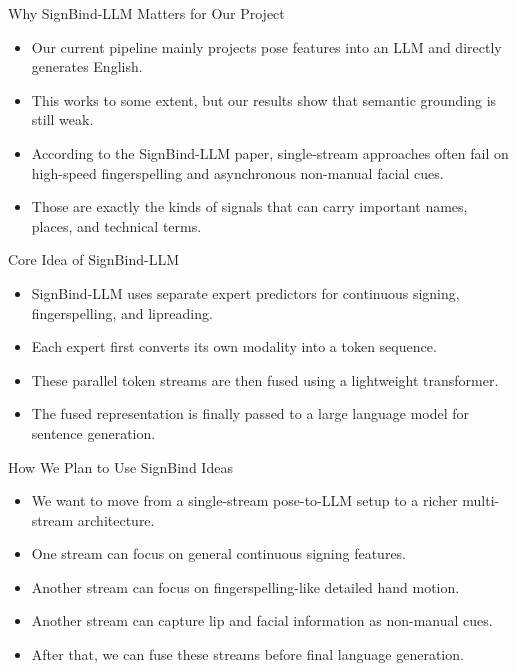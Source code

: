 \documentclass[aspectratio=169]{beamer}
\begin{document}
\begin{frame}{Why SignBind-LLM Matters for Our Project}
\begin{itemize}
  \item Our current pipeline mainly projects pose features into an LLM and directly generates English.
  \item This works to some extent, but our results show that semantic grounding is still weak.
  \item According to the SignBind-LLM paper, single-stream approaches often fail on high-speed fingerspelling and asynchronous non-manual facial cues.
  \item Those are exactly the kinds of signals that can carry important names, places, and technical terms.
\end{itemize}
\end{frame}

\begin{frame}{Core Idea of SignBind-LLM}
\begin{itemize}
  \item SignBind-LLM uses separate expert predictors for continuous signing, fingerspelling, and lipreading.
  \item Each expert first converts its own modality into a token sequence.
  \item These parallel token streams are then fused using a lightweight transformer.
  \item The fused representation is finally passed to a large language model for sentence generation.
\end{itemize}
\end{frame}

\begin{frame}{How We Plan to Use SignBind Ideas}
\begin{itemize}
  \item We want to move from a single-stream pose-to-LLM setup to a richer multi-stream architecture.
  \item One stream can focus on general continuous signing features.
  \item Another stream can focus on fingerspelling-like detailed hand motion.
  \item Another stream can capture lip and facial information as non-manual cues.
  \item After that, we can fuse these streams before final language generation.
\end{itemize}
\end{frame}
\end{document}
